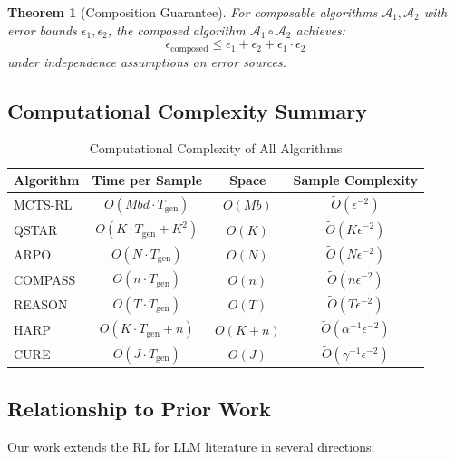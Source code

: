 \documentclass[11pt,a4paper]{article}
\newtheorem{theorem}{Theorem}[section]
\newcommand{\calA}{\mathcal{A}}
\begin{document}
\begin{theorem}[Composition Guarantee]
\label{thm:composition}
For composable algorithms $\calA_1, \calA_2$ with error bounds $\epsilon_1, \epsilon_2$, the composed algorithm $\calA_1 \circ \calA_2$ achieves:
\begin{equation}
    \epsilon_{\text{composed}} \leq \epsilon_1 + \epsilon_2 + \epsilon_1 \cdot \epsilon_2
\end{equation}
under independence assumptions on error sources.
\end{theorem}

\subsection{Computational Complexity Summary}

\begin{table}[h]
\centering
\caption{Computational Complexity of All Algorithms}
\begin{tabular}{lccc}
\toprule
\textbf{Algorithm} & \textbf{Time per Sample} & \textbf{Space} & \textbf{Sample Complexity} \\
\midrule
MCTS-RL & $O(Mbd \cdot T_{\text{gen}})$ & $O(Mb)$ & $\tilde{O}(\epsilon^{-2})$ \\
QSTAR & $O(K \cdot T_{\text{gen}} + K^2)$ & $O(K)$ & $\tilde{O}(K\epsilon^{-2})$ \\
ARPO & $O(N \cdot T_{\text{gen}})$ & $O(N)$ & $\tilde{O}(N\epsilon^{-2})$ \\
COMPASS & $O(n \cdot T_{\text{gen}})$ & $O(n)$ & $\tilde{O}(n\epsilon^{-2})$ \\
REASON & $O(T \cdot T_{\text{gen}})$ & $O(T)$ & $\tilde{O}(T\epsilon^{-2})$ \\
HARP & $O(K \cdot T_{\text{gen}} + n)$ & $O(K + n)$ & $\tilde{O}(\alpha^{-1}\epsilon^{-2})$ \\
CURE & $O(J \cdot T_{\text{gen}})$ & $O(J)$ & $\tilde{O}(\gamma^{-1}\epsilon^{-2})$ \\
\bottomrule
\end{tabular}
\end{table}

\subsection{Relationship to Prior Work}

Our work extends the RL for LLM literature in several directions:
\end{document}
